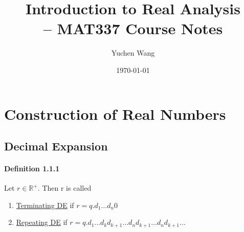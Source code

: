 \documentclass[11pt]{article}
\title{Introduction to Real Analysis \\ -- MAT337 Course Notes}
\author{Yuchen Wang}
\date{\today}
\newcommand{\real}[0]{\mathbb{R}}
\newcommand{\under}[1]{\underline{#1}}
\begin{document}
    \maketitle
    \tableofcontents
    \newpage
\section{Construction of Real Numbers}
\subsection{Decimal Expansion}
\paragraph{Definition 1.1.1}
Let $r \in \real^{+}$. Then r is called
\begin{enumerate}
	\item \under{Terminating DE} if $r = q.d_1\hdots d_n 0$
	\item \under{Repeating DE} if $r = q.d_1\hdots d_k d_{k+1}\hdots d_nd_{k+1}\hdots d_nd_{k+1}\hdots$
\end{enumerate}
\end{document}
